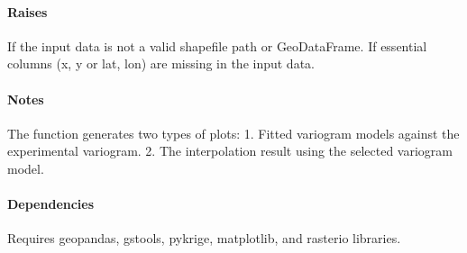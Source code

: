 \documentclass[letterpaper,10pt,english]{sphinxmanual}
\begin{document}
\begin{fulllineitems}
\begin{description}
\end{description}


\paragraph{Raises}
\label{\detokenize{akhdefo_functions:raises}}\begin{description}
\sphinxAtStartPar
If the input data is not a valid shapefile path or GeoDataFrame.
If essential columns (x, y or lat, lon) are missing in the input data.

\end{description}


\paragraph{Notes}
\label{\detokenize{akhdefo_functions:id23}}
\sphinxAtStartPar
The function generates two types of plots:
1. Fitted variogram models against the experimental variogram.
2. The interpolation result using the selected variogram model.


\paragraph{Dependencies}
\label{\detokenize{akhdefo_functions:dependencies}}
\sphinxAtStartPar
Requires geopandas, gstools, pykrige, matplotlib, and rasterio libraries.

\end{fulllineitems}

\end{document}
